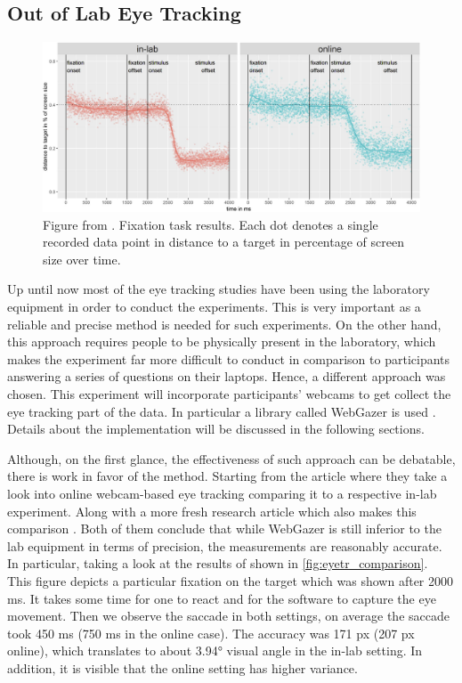 \documentclass[11pt,a4paper]{article}
\begin{document}
\subsection{Out of Lab Eye Tracking} \label{sec:eyetr}
\begin{figure}
    \centering
    \includegraphics[width=1\linewidth]{images/tracker_comparison.png}
    \caption{Figure from \cite{Semmelmann_2018}. Fixation task results. Each dot denotes a single recorded data point in distance to a target in percentage of screen size over time.}
    \label{fig:eyetr_comparison}
\end{figure}
Up until now most of the eye tracking studies have been using the laboratory equipment in order to conduct the experiments. This is very important as a reliable and precise method is needed for such experiments. On the other hand, this approach requires people to be physically present in the laboratory, which makes the experiment far more difficult to conduct in comparison to participants answering a series of questions on their laptops. Hence, a different approach was chosen. This experiment will incorporate participants' webcams to get collect the eye tracking part of the data. In particular a library called WebGazer is used \cite{wegbazer}. Details about the implementation will be discussed in the following sections. 

Although, on the first glance, the effectiveness of such approach can be debatable, there is work in favor of the method. Starting from the article \cite{Semmelmann_2018} where they take a look into online webcam-based eye tracking comparing it to a respective in-lab experiment. Along with a more fresh research article which also makes this comparison \citep{Wisiecka_2022}. Both of them conclude that while WebGazer is still inferior to the lab equipment in terms of precision, the measurements are reasonably accurate. In particular, taking a look at the results of \cite{Semmelmann_2018} shown in \autoref{fig:eyetr_comparison}. This figure depicts a particular fixation on the target which was shown after 2000 ms. It takes some time for one to react and for the software to capture the eye movement. Then we observe the saccade in both settings, on average the saccade took 450 ms (750 ms in the online case). The accuracy was 171 px (207 px online), which translates to about 3.94° visual angle in the in-lab setting. In addition, it is visible that the online setting has higher variance.
\end{document}
